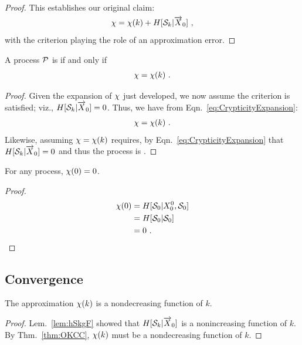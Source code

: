 \begin{proof}
This establishes our original claim:
\begin{align*}
\chi = \chi(k) + H[\mathcal{S}_k | \smash{\overrightarrow{{X}}}_0] ~,
\end{align*}
with the  criterion playing the role of an approximation
error.

\end{proof}

\begin{Cor}
A process $\mathcal{P}$ is  if and only if
\begin{align*}
\chi = \chi(k) ~.
\end{align*}
\label{cor:OKCC}
\end{Cor}

\begin{proof}
Given the  expansion of $\chi$ just developed, we now assume the
 criterion is satisfied; viz.,
$H[\mathcal{S}_k | \smash{\overrightarrow{{X}}}_0] = 0$. Thus, we have from
Eqn.~\ref{eq:CrypticityExpansion}:
\begin{align*}
\chi = \chi(k) ~.
\end{align*}
Likewise, assuming $\chi = \chi(k)$ requires, by Eqn.~\ref{eq:CrypticityExpansion} 
that $H[\mathcal{S}_k | \smash{\overrightarrow{{X}}}_0] = 0$ and thus the process is .
\end{proof}

\begin{Cor}
For any process, $\chi(0) = 0$.
\label{cor:ZeroCrypticity}
\end{Cor}

\begin{proof}
\begin{align*}
\chi(0) &= H[\mathcal{S}_0 | {X}_0^0, \mathcal{S}_0]\\
  &= H[\mathcal{S}_0 | \mathcal{S}_0] \\
  &= 0~.
\end{align*}
\end{proof}

\subsection{Convergence}

\begin{Prop}
The approximation $\chi(k)$ is a nondecreasing function of $k$. 
\label{prop:NonDecreasingCrypticity}
\end{Prop}

\begin{proof}
Lem.~\ref{lem:hSkgF} showed that $H[\mathcal{S}_k | \smash{\overrightarrow{{X}}}_0]$ is a
nonincreasing function of $k$.  By Thm.~\ref{thm:OKCC}, $\chi(k)$ must be a
nondecreasing function of $k$.
\end{proof} 

